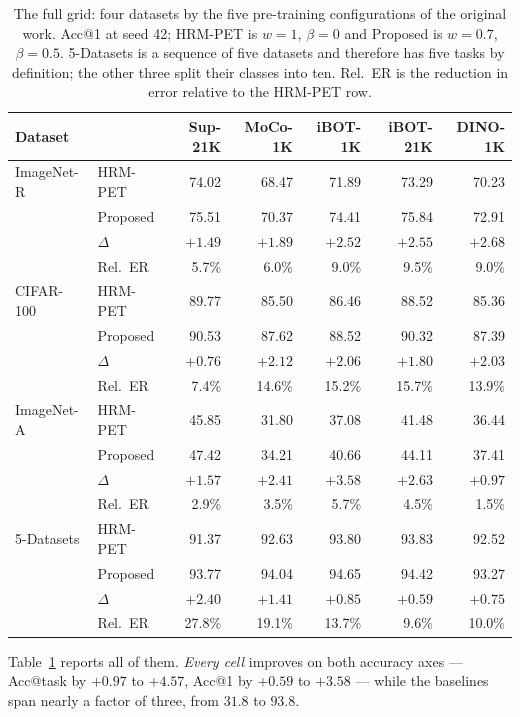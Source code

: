 \documentclass[runningheads]{llncs}
\begin{document}
\begin{table}
\caption{The full grid: four datasets by the five pre-training configurations of
the original work. Acc@1 at seed 42; HRM-PET is $w=1$, $\beta=0$ and Proposed is
$w=0.7$, $\beta=0.5$. 5-Datasets is a sequence of five datasets and therefore has
five tasks by definition; the other three split their classes into ten. Rel.\ ER
is the reduction in error relative to the HRM-PET row.}
\label{tab:grid}
\begin{tabular}{llrrrrr}
\hline
Dataset & & Sup-21K & MoCo-1K & iBOT-1K & iBOT-21K & DINO-1K\\
\hline
ImageNet-R & HRM-PET   & 74.02 & 68.47 & 71.89 & 73.29 & 70.23\\
           & Proposed  & 75.51 & 70.37 & 74.41 & 75.84 & 72.91\\
           & $\Delta$  & $+1.49$ & $+1.89$ & $+2.52$ & $+2.55$ & $+2.68$\\
           & Rel.\ ER  & 5.7\% & 6.0\% & 9.0\% & 9.5\% & 9.0\%\\
\hline
CIFAR-100  & HRM-PET   & 89.77 & 85.50 & 86.46 & 88.52 & 85.36\\
           & Proposed  & 90.53 & 87.62 & 88.52 & 90.32 & 87.39\\
           & $\Delta$  & $+0.76$ & $+2.12$ & $+2.06$ & $+1.80$ & $+2.03$\\
           & Rel.\ ER  & 7.4\% & 14.6\% & 15.2\% & 15.7\% & 13.9\%\\
\hline
ImageNet-A & HRM-PET   & 45.85 & 31.80 & 37.08 & 41.48 & 36.44\\
           & Proposed  & 47.42 & 34.21 & 40.66 & 44.11 & 37.41\\
           & $\Delta$  & $+1.57$ & $+2.41$ & $+3.58$ & $+2.63$ & $+0.97$\\
           & Rel.\ ER  & 2.9\% & 3.5\% & 5.7\% & 4.5\% & 1.5\%\\
\hline
5-Datasets & HRM-PET   & 91.37 & 92.63 & 93.80 & 93.83 & 92.52\\
           & Proposed  & 93.77 & 94.04 & 94.65 & 94.42 & 93.27\\
           & $\Delta$  & $+2.40$ & $+1.41$ & $+0.85$ & $+0.59$ & $+0.75$\\
           & Rel.\ ER  & 27.8\% & 19.1\% & 13.7\% & 9.6\% & 10.0\%\\
\hline
\end{tabular}
\end{table}

Table~\ref{tab:grid} reports all of them. \emph{Every cell} improves on both
accuracy axes --- Acc@task by $+0.97$ to $+4.57$, Acc@1 by $+0.59$ to $+3.58$
--- while the baselines span nearly a factor of three, from $31.8$ to $93.8$.
\end{document}
